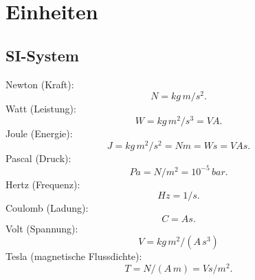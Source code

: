 \newpage
\section{Einheiten}
\subsection{SI-System}
Newton (Kraft):
\begin{equation}
\unit{N}=\unit{kg\,m/s^2}.
\end{equation}
Watt (Leistung):
\begin{equation}
\unit{W}=\unit{kg\,m^2/s^3}=\unit{VA}.
\end{equation}
Joule (Energie):
\begin{equation}
\unit{J}=\unit{kg\,m^2/s^2}=\unit{Nm}=\unit{Ws}=\unit{VAs}.
\end{equation}
Pascal (Druck):
\begin{equation}
\unit{Pa}=\unit{N/m^2} = 10^{-5}\,\unit{bar}.
\end{equation}
Hertz (Frequenz):
\begin{equation}
\unit{Hz} = \unit{1/s}.
\end{equation}
Coulomb (Ladung):
\begin{equation}
\unit{C} = \unit{As}.
\end{equation}
Volt (Spannung):
\begin{equation}
\unit{V} = \unit{kg\,m^2/(A\,s^3)}
\end{equation}
Tesla (magnetische Flussdichte):
\begin{equation}
\unit{T} = \unit{N/(A\,m)} = \unit{Vs/m^2}.
\end{equation}

